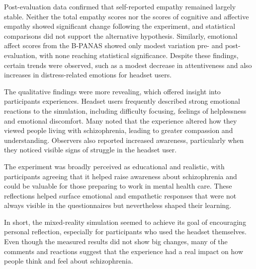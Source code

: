 \vspace{1em}

Post-evaluation data confirmed that self-reported empathy remained largely stable. Neither the total empathy scores nor the scores of cognitive and affective empathy showed significant change following the experiment, and statistical comparisons did not support the alternative hypothesis. Similarly, emotional affect scores from the B-PANAS showed only modest variation pre- and post-evaluation, with none reaching statistical significance. Despite these findings, certain trends were observed, such as a modest decrease in attentiveness and also increases in distress-related emotions for headset users.

\vspace{1em}

The qualitative findings were more revealing, which offered insight into participants experiences. Headset users frequently described strong emotional reactions to the simulation, including difficulty focusing, feelings of helplessness and emotional discomfort. Many noted that the experience altered how they viewed people living with schizophrenia, leading to greater compassion and understanding. Observers also reported increased awareness, particularly when they noticed visible signs of struggle in the headset user.

The experiment was broadly perceived as educational and realistic, with participants agreeing that it helped raise awareness about schizophrenia and could be valuable for those preparing to work in mental health care. These reflections helped surface emotional and empathetic responses that were not always visible in the questionnaires but nevertheless shaped their learning.

\vspace{1em}

In short, the mixed-reality simulation seemed to achieve its goal of encouraging personal reflection, especially for participants who used the headset themselves. Even though the measured results did not show big changes, many of the comments and reactions suggest that the experience had a real impact on how people think and feel about schizophrenia.